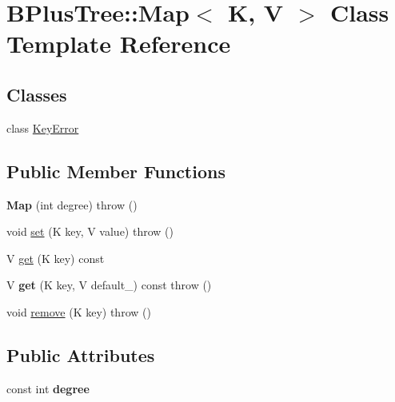 \hypertarget{class_b_plus_tree_1_1_map}{}\section{B\+Plus\+Tree\+:\+:Map$<$ K, V $>$ Class Template Reference}
\label{class_b_plus_tree_1_1_map}
\subsection*{Classes}
\begin{DoxyCompactItemize}
\item 
class \hyperlink{class_b_plus_tree_1_1_map_1_1_key_error}{Key\+Error}
\end{DoxyCompactItemize}
\subsection*{Public Member Functions}
\begin{DoxyCompactItemize}
\item 
\mbox{\label{class_b_plus_tree_1_1_map_ae4b13c6da4151d439ec19618cfb1bab4}} 
{\bfseries Map} (int degree)  throw ()
\item 
void \hyperlink{class_b_plus_tree_1_1_map_ab29d127d6b90f8f7c84270d4f1c034f9}{set} (K key, V value)  throw ()
\item 
V \hyperlink{class_b_plus_tree_1_1_map_a28d991d412dd816530c8509274d48a0a}{get} (K key) const
\item 
\mbox{\label{class_b_plus_tree_1_1_map_aaefa90cc584499c4ff4ee8f2d332b764}} 
V {\bfseries get} (K key, V default\+\_\+) const  throw ()
\item 
void \hyperlink{class_b_plus_tree_1_1_map_a99b2e74d5c38e0e27fe8031e1f9990f8}{remove} (K key)  throw ()
\end{DoxyCompactItemize}
\subsection*{Public Attributes}
\begin{DoxyCompactItemize}
\item 
\mbox{\label{class_b_plus_tree_1_1_map_a8d26aa7480f3cfbdf35e3cd02cea6bbf}} 
const int {\bfseries degree}
\end{DoxyCompactItemize}


